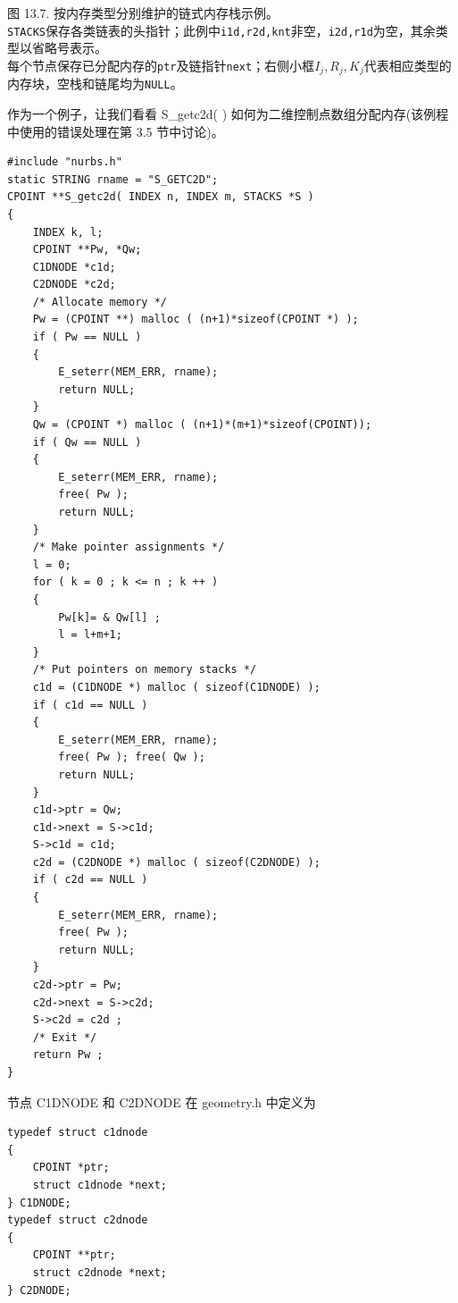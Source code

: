 \documentclass[../main.tex]{subfiles}
\begin{document}
\begin{center}
\begin{minipage}{37cm}
\centering
{}
\par\smallskip
图 13.7. 按内存类型分别维护的链式内存栈示例。\\
\texttt{STACKS}保存各类链表的头指针；此例中\texttt{i1d,r2d,knt}非空，\texttt{i2d,r1d}为空，其余类型以省略号表示。\\
每个节点保存已分配内存的\texttt{ptr}及链指针\texttt{next}；右侧小框$I_j,R_j,K_j$代表相应类型的内存块，空栈和链尾均为\texttt{NULL}。
\end{minipage}
\end{center}

作为一个例子，让我们看看 S\_getc2d(   ) 如何为二维控制点数组分配内存(该例程中使用的错误处理在第 3.5 节中讨论)。

\begin{verbatim}
#include "nurbs.h"
static STRING rname = "S_GETC2D";
CPOINT **S_getc2d( INDEX n, INDEX m, STACKS *S )
{
    INDEX k, l;
    CPOINT **Pw, *Qw;
    C1DNODE *c1d;
    C2DNODE *c2d;
    /* Allocate memory */
    Pw = (CPOINT **) malloc ( (n+1)*sizeof(CPOINT *) );
    if ( Pw == NULL )
    {
        E_seterr(MEM_ERR, rname);
        return NULL;
    }
    Qw = (CPOINT *) malloc ( (n+1)*(m+1)*sizeof(CPOINT));
    if ( Qw == NULL )
    {
        E_seterr(MEM_ERR, rname);
        free( Pw );
        return NULL;
    }
    /* Make pointer assignments */
    l = 0;
    for ( k = 0 ; k <= n ; k ++ )
    {
        Pw[k]= & Qw[l] ;
        l = l+m+1;
    }
    /* Put pointers on memory stacks */
    c1d = (C1DNODE *) malloc ( sizeof(C1DNODE) );
    if ( c1d == NULL )
    {
        E_seterr(MEM_ERR, rname);
        free( Pw ); free( Qw );
        return NULL;
    }
    c1d->ptr = Qw;
    c1d->next = S->c1d;
    S->c1d = c1d;
    c2d = (C2DNODE *) malloc ( sizeof(C2DNODE) );
    if ( c2d == NULL )
    {
        E_seterr(MEM_ERR, rname);
        free( Pw );
        return NULL;
    }
    c2d->ptr = Pw;
    c2d->next = S->c2d;
    S->c2d = c2d ;
    /* Exit */
    return Pw ;
}
\end{verbatim}

节点 C1DNODE 和 C2DNODE 在 geometry.h 中定义为

\begin{verbatim}
typedef struct c1dnode
{
    CPOINT *ptr;
    struct c1dnode *next;
} C1DNODE;
typedef struct c2dnode
{
    CPOINT **ptr;
    struct c2dnode *next;
} C2DNODE;
\end{verbatim}
\end{document}
